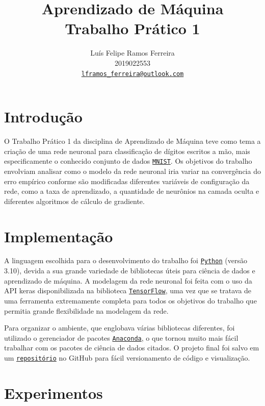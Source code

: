 \documentclass{article}
\title{Aprendizado de Máquina \\ Trabalho Prático 1}
\author{Luís Felipe Ramos Ferreira \\ 2019022553 \\
    \href{mailto:lframos_ferreira@outlook.com}{\texttt{lframos\_ferreira@outlook.com}}}
\begin{document}
\maketitle

\section{Introdução}

O Trabalho Prático 1 da disciplina de Aprendizado de Máquina teve como tema a criação de uma rede neuronal para classificação de dígitos escritos a mão, mais especificamente o conhecido conjunto de dados \href{https://en.wikipedia.org/wiki/MNIST_database#:~:text=The%20MNIST%20database%20(Modified%20National,the%20field%20of%20machine%20learning.}{\texttt{MNIST}}. Os objetivos do trabalho envolviam analisar como o modelo da rede neuronal iria variar na convergência do erro empírico conforme são modificadas diferentes variáveis de configuração da rede, como a taxa de aprendizado, a quantidade de neurônios na camada oculta e diferentes algoritmos de cálculo de gradiente.

\section{Implementação}

A linguagem escolhida para o desenvolvimento do trabalho foi \href{https://www.python.org/}{\texttt{Python}} (versão 3.10), devida a sua grande variedade de bibliotecas úteis para ciência de dados e aprendizado de máquina. A modelagem da rede neuronal foi feita com o uso da API keras disponibilizada na biblioteca \href{https://www.tensorflow.org/}{\texttt{TensorFlow}}, uma vez que se tratava de uma ferramenta extremamente completa para todos os objetivos do trabalho que permitia grande flexibilidade na modelagem da rede.

Para organizar o ambiente, que englobava várias bibliotecas diferentes, foi utilizado o gerenciador de pacotes \href{https://www.anaconda.com/}{\texttt{Anaconda}}, o que tornou muito mais fácil trabalhar com os pacotes de ciência de dados citados. O projeto final foi salvo em um \href{https://github.com/lframosferreira/MNIST-MLP}{\texttt{repositório}} no GitHub
para fácil versionamento de código e visualização.

\section{Experimentos}
\end{document}
